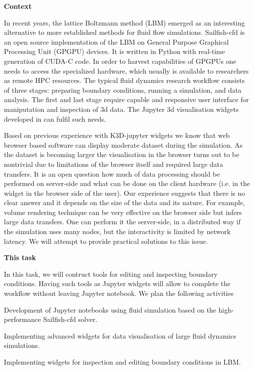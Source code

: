 \begin{task}[
  title=Application: Visualisation and control of fluid dynamics in Jupyter notebook,
  id=application-gpu,
  lead=SIL,
  PM=13,
  wphases={4-36},
  partners={EGI}
]

\textbf{Context}

In recent years, the lattice Boltzmann method (LBM) emerged as an
interesting alternative to more established methods for fluid flow
simulations. Sailfish-cfd \cite{januszewski2014sailfish} is an open
source implementation of the LBM on General Purpose Graphical Processing
Unit (GPGPU) devices. It is written in Python with real-time
generation of CUDA-C code.  In order to harvest capabilities of GPGPUs
one needs to access the specialized hardware, which usually is
available to researchers as remote HPC resources.  The typical fluid
dynamics research workflow consists of three stages: preparing
boundary conditions, running a simulation, and data analysis. The
first and last stage require capable and responsive user interface for
maniputation and inspection of 3d data.  The Jupyter 3d visualisation
widgets developed in  can fulfil
such needs.

Based on previous experience with K3D-jupyter\cite{K3D}
widgets we know that web browser based software can display moderate
dataset during the simulation. As the dataset is becoming larger the
visualisation in the browser turns out to be nontrivial due to
limitations of the browser itself and required large data transfers. It is
an open question how much of data processing should be performed on
server-side and what can be done on the client hardware (i.e. in the
widget in the browser side of the user). Our
experience suggests that there is no clear answer and it depends on
the size of the data and its nature. For example, volume rendering
technique can be very effective on the browser side but infers large data
transfers. One can perform it the server-side, in a distributed way if
the simulation uses many nodes, but the interactivity is limited by
network latency. We will attempt to provide practical
solutions to this issue.
%


\textbf{This task}


In this task, we will contruct tools for editing and inspecting
boundary conditions. Having such tools as Jupyter widgets will allow
to complete the workflow without leaving Jupyter notebook. We plan the
following activities
\begin{compactitem}
\item Development of Jupyter notebooks using fluid
  simulation based on the high-performance Sailfish-cfd solver.
\item Implementing advanced widgets for data visualisation of large
  fluid dynamics simulations.
\item Implementing widgets for inspection and editing boundary
  conditions in LBM.
\end{compactitem}


\end{task}
